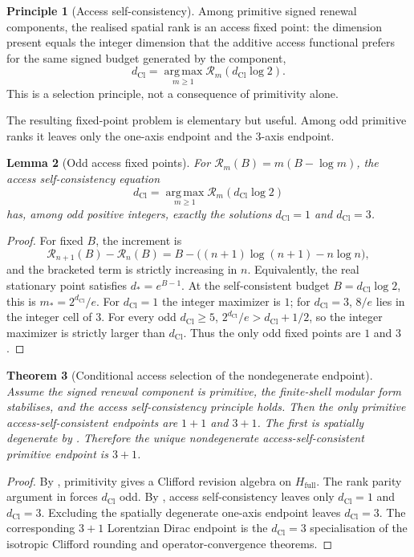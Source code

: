 \documentclass[11pt]{article}
\newtheorem{theorem}{Theorem}[section]
\newtheorem{lemma}[theorem]{Lemma}
\theoremstyle{definition}
\newtheorem{principle}[theorem]{Principle}
\theoremstyle{remark}
\newcommand{\Hf}{H_{\mathrm{full}}}
\newcommand{\Acc}{\mathcal{R}}
\newcommand{\argmax}{\operatorname*{arg\,max}}
\newcommand{\dCl}{d_{\mathrm{Cl}}}
\begin{document}
\begin{principle}[Access self-consistency]
\label{prin:access-self-consistency}
Among primitive signed renewal components, the realised spatial rank is an
access fixed point: the dimension present equals the integer dimension that the
additive access functional prefers for the same signed budget generated by the
component,
\[
  \dCl=\argmax_{m\ge1}\Acc_{m}(\dCl\log2).
\]
This is a selection principle, not a consequence of primitivity alone.
\end{principle}

The resulting fixed-point problem is elementary but useful.  Among odd primitive
ranks it leaves only the one-axis endpoint and the \(3\)-axis endpoint.

\begin{lemma}[Odd access fixed points]
\label{lem:odd-access-fixed-points}
For \(\Acc_m(B)=m(B-\log m)\), the access self-consistency equation
\[
  \dCl=\argmax_{m\ge1}\Acc_{m}(\dCl\log2)
\]
has, among odd positive integers, exactly the solutions \(\dCl=1\) and \(\dCl=3\).
\end{lemma}

\begin{proof}
For fixed \(B\), the increment is
\[
  \Acc_{n+1}(B)-\Acc_n(B)
  =B-\bigl((n+1)\log(n+1)-n\log n\bigr),
\]
and the bracketed term is strictly increasing in \(n\).  Equivalently, the real
stationary point satisfies \(d_*=e^{B-1}\).  At the self-consistent budget
\(B=\dCl\log2\), this is \(m_*=2^{\dCl}/e\).  For \(\dCl=1\) the integer maximizer is
\(1\); for \(\dCl=3\), \(8/e\) lies in the integer cell of \(3\).  For every odd
\(\dCl\ge5\), \(2^{\dCl}/e>\dCl+1/2\), so the integer maximizer is strictly larger than
\(\dCl\).  Thus the only odd fixed points are \(1\) and \(3\).
\end{proof}

\begin{theorem}[Conditional access selection of the nondegenerate endpoint]
\label{thm:conditional-access-3plus1}
Assume the signed renewal component is primitive, the finite-shell modular form
stabilises, and the access self-consistency principle 
holds.  Then the only primitive access-self-consistent endpoints are \(1+1\)
and \(3+1\).  The first is spatially degenerate by
.  Therefore the unique nondegenerate
access-self-consistent primitive endpoint is \(3+1\).
\end{theorem}

\begin{proof}
By , primitivity gives a Clifford revision algebra
on \(\Hf\).  The rank parity argument in
 forces \(\dCl\) odd.  By
, access self-consistency leaves only
\(\dCl=1\) and \(\dCl=3\).  Excluding the spatially degenerate one-axis endpoint leaves
\(\dCl=3\).  The corresponding \(3+1\) Lorentzian Dirac endpoint is the \(\dCl=3\)
specialisation of the isotropic Clifford rounding and operator-convergence
theorems.
\end{proof}
\end{document}
